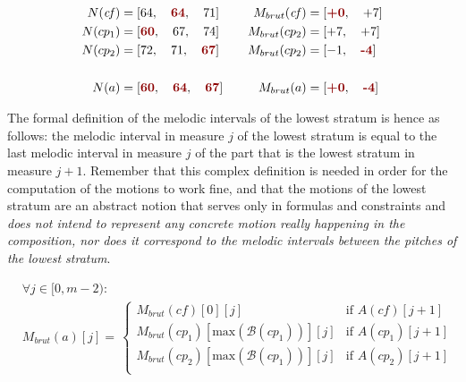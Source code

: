 \begin{equation}
    \begin{aligned}        
    N(\mathit{cf}) &= [64,\quad  \textcolor{darkred}{\textbf{64}},\quad  71] \quad 
    &M_{brut}(\mathit{cf}) &= [\textcolor{darkred}{\textbf{+0}}, \quad +7]\\
    N(cp_1) &= [\textcolor{darkred}{\textbf{60}},\quad  67,\quad  74] \quad 
    &M_{brut}(cp_2) &= [+7, \quad +7]\\
    N(cp_2) &= [72,\quad  71,\quad  \textcolor{darkred}{\textbf{67}}] \quad 
    &M_{brut}(cp_2) &= [-1, \quad \textcolor{darkred}{\textbf{-4}}]\\
    \\
    N(a) &= [\textcolor{darkred}{\textbf{60}},\quad  \textcolor{darkred}{\textbf{64}},\quad  \textcolor{darkred}{\textbf{67}}] \quad 
    &M_{brut}(a) &= [\textcolor{darkred}{\textbf{+0}}, \quad \textcolor{darkred}{\textbf{-4}}]\\
\end{aligned}
\label{eq:defining-m-intervals-bass}
\end{equation}


The formal definition of the melodic intervals of the lowest stratum is hence as follows: the melodic interval in measure $j$ of the lowest stratum is equal to the last melodic interval in measure $j$ of the part that is the lowest stratum in measure $j+1$. Remember that this complex definition is needed in order for the computation of the motions to work fine, and that the motions of the lowest stratum are an abstract notion that serves only in formulas and constraints and \textit{does not intend to represent any concrete motion really happening in the composition, nor does it correspond to the melodic intervals between the pitches of the lowest stratum}.

\begin{equation}
    \begin{aligned}
        &\forall j \in [0, m-2):\\
        &M_{brut}(a)[j] = \,  
        \begin{cases}
            M_{brut}(\mathit{cf})[0][j] & \text{if } A(\mathit{cf})[j+1]\\
            M_{brut}(cp_1)[\text{max}(\mathcal{B}(cp_1))][j] & \text{if } A(cp_1)[j+1]\\
            M_{brut}(cp_2)[\text{max}(\mathcal{B}(cp_1))][j] & \text{if } A(cp_2)[j+1]\\
        \end{cases}
    \end{aligned}
\end{equation}

